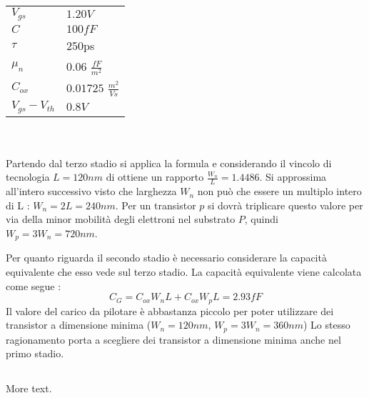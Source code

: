 \documentclass[11pt]{article} %
\begin{document}
\begin{tabular}{|ll|}
\hline
$V_{gs}$ & $1.20V$ \\
$C$ & $100fF$ \\
$\tau$ & 250ps\\
$\mu_{n}$ & $0.06$  $\frac{fF}{m^2}$  \\
$C_{ox}$ & $0.01725$ $\frac{m^2}{Vs}$  \\
$V_{gs} - V_{th}$ & $0.8V$ \\
\hline
\end{tabular}
\mbox{}\\
\\
Partendo dal terzo stadio si applica la formula e considerando il vincolo di tecnologia $L= 120 nm$ di ottiene un rapporto $\frac {W_{n}}{L}= 1.4486$.
Si approssima all'intero successivo visto che larghezza  $W_{n}$ non può che essere un multiplo intero di L :   $W_{n}=2L= 240nm$.
Per un transistor $p$ si dovrà triplicare questo valore per via della minor mobilità degli elettroni nel substrato $P$, quindi $W_{p}=3W_{n}= 720nm$.

Per quanto riguarda il secondo stadio è necessario considerare la capacità equivalente che esso vede sul terzo stadio.
La capacità equivalente viene calcolata come segue :
\begin{equation}
C_{G}= C_{ox}W_{n}L+C_{ox}W_{p}L= 2.93fF
\end{equation}
Il valore del carico da pilotare è abbastanza piccolo per poter utilizzare dei transistor a dimensione minima ($W_{n}=120 nm$, $W_{p}=3W_{n}= 360nm$)
Lo stesso ragionamento porta a scegliere dei transistor a dimensione minima anche nel primo stadio. 

\subsection{}

More text.
\end{document}
